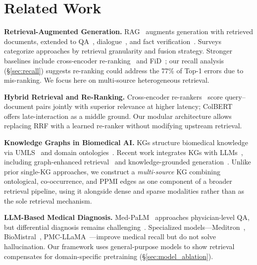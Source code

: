 \documentclass[runningheads]{llncs}
\begin{document}
\section{Related Work}
\label{sec:related}

\textbf{Retrieval-Augmented Generation.} RAG~\cite{lewis2020retrieval} augments generation with retrieved documents, extended to QA~\cite{izacard2021leveraging}, dialogue~\cite{shuster2021retrieval}, and fact verification~\cite{thorne2018fever}. Surveys~\cite{gao2023retrieval,zhao2024retrieval} categorize approaches by retrieval granularity and fusion strategy. Stronger baselines include cross-encoder re-ranking~\cite{nogueira2020passage} and FiD~\cite{izacard2021leveraging}; our recall analysis (\S\ref{sec:recall}) suggests re-ranking could address the 77\% of Top-1 errors due to mis-ranking. We focus here on multi-source heterogeneous retrieval.

\textbf{Hybrid Retrieval and Re-Ranking.} Cross-encoder re-rankers~\cite{nogueira2020passage} score query--document pairs jointly with superior relevance at higher latency; ColBERT~\cite{khattab2020colbert} offers late-interaction as a middle ground. Our modular architecture allows replacing RRF with a learned re-ranker without modifying upstream retrieval.

\textbf{Knowledge Graphs in Biomedical AI.} KGs structure biomedical knowledge via UMLS~\cite{bodenreider2004unified} and domain ontologies~\cite{santos2022knowledge,chandak2023building}. Recent work integrates KGs with LLMs~\cite{pan2024unifying}, including graph-enhanced retrieval~\cite{he2024gretriever} and knowledge-grounded generation~\cite{yasunaga2022deep}. Unlike prior single-KG approaches, we construct a \emph{multi-source} KG combining ontological, co-occurrence, and PPMI edges as one component of a broader retrieval pipeline, using it alongside dense and sparse modalities rather than as the sole retrieval mechanism.

\textbf{LLM-Based Medical Diagnosis.} Med-PaLM~\cite{singhal2023large} approaches physician-level QA, but differential diagnosis remains challenging~\cite{mcduff2023towards}. Specialized models---Meditron~\cite{chen2023meditron}, BioMistral~\cite{labrak2024biomistral}, PMC-LLaMA~\cite{wu2024pmcllama}---improve medical recall but do not solve hallucination. Our framework uses general-purpose models to show retrieval compensates for domain-specific pretraining (\S\ref{sec:model_ablation}).
\end{document}

